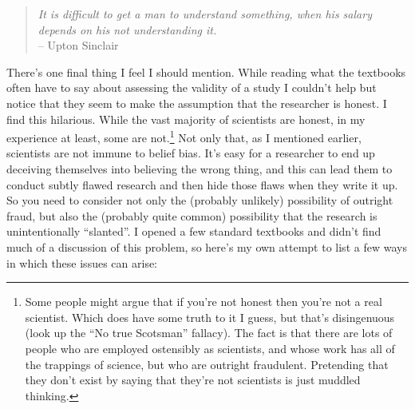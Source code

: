 \documentclass[
  a4paper,
]{book}
\begin{document}
\begin{quote}
\emph{It is difficult to get a man to understand something, when his
salary depends on his not understanding it.}\\
-- Upton Sinclair
\end{quote}

There's one final thing I feel I should mention. While reading what the
textbooks often have to say about assessing the validity of a study I
couldn't help but notice that they seem to make the assumption that the
researcher is honest. I find this hilarious. While the vast majority of
scientists are honest, in my experience at least, some are
not.\footnote{Some people might argue that if you're not honest then
  you're not a real scientist. Which does have some truth to it I guess,
  but that's disingenuous (look up the ``No true Scotsman'' fallacy).
  The fact is that there are lots of people who are employed ostensibly
  as scientists, and whose work has all of the trappings of science, but
  who are outright fraudulent. Pretending that they don't exist by
  saying that they're not scientists is just muddled thinking.} Not only
that, as I mentioned earlier, scientists are not immune to belief bias.
It's easy for a researcher to end up deceiving themselves into believing
the wrong thing, and this can lead them to conduct subtly flawed
research and then hide those flaws when they write it up. So you need to
consider not only the (probably unlikely) possibility of outright fraud,
but also the (probably quite common) possibility that the research is
unintentionally ``slanted''. I opened a few standard textbooks and
didn't find much of a discussion of this problem, so here's my own
attempt to list a few ways in which these issues can arise:
\end{document}
